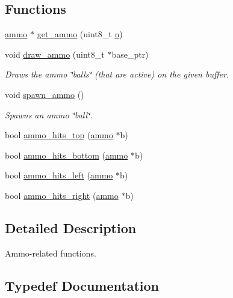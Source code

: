 \subsection*{Functions}
\begin{DoxyCompactItemize}
\item 
\hyperlink{structammo}{ammo} $\ast$ \hyperlink{group__ammo_gafd32649160360f67e00c8dc8186edeef}{get\+\_\+ammo} (uint8\+\_\+t \hyperlink{projectiles_8c_a5a648f5ec00c526b0dfa2df7a272c6c0}{n})
\item 
void \hyperlink{group__ammo_ga4d649b8b03319d3a2cdc2f171f9112ea}{draw\+\_\+ammo} (uint8\+\_\+t $\ast$base\+\_\+ptr)
\begin{DoxyCompactList}\small\item\em Draws the ammo \char`\"{}balls\char`\"{} (that are active) on the given buffer. \end{DoxyCompactList}\item 
void \hyperlink{group__ammo_gac8e56296d8320fc25379a842c74fd72e}{spawn\+\_\+ammo} ()
\begin{DoxyCompactList}\small\item\em Spawns an ammo \char`\"{}ball\char`\"{}. \end{DoxyCompactList}\item 
bool \hyperlink{group__ammo_ga05181ac613d5d6d1d1070031b5461191}{ammo\+\_\+hits\+\_\+top} (\hyperlink{structammo}{ammo} $\ast$b)
\item 
bool \hyperlink{group__ammo_gaec2edee56f7204786a3640973e4f8f7f}{ammo\+\_\+hits\+\_\+bottom} (\hyperlink{structammo}{ammo} $\ast$b)
\item 
bool \hyperlink{group__ammo_ga23525b3b56d7c2217da8179045d80db6}{ammo\+\_\+hits\+\_\+left} (\hyperlink{structammo}{ammo} $\ast$b)
\item 
bool \hyperlink{group__ammo_gabab3a68eb48f6e4f339c648f6cec5522}{ammo\+\_\+hits\+\_\+right} (\hyperlink{structammo}{ammo} $\ast$b)
\end{DoxyCompactItemize}


\subsection{Detailed Description}
Ammo-\/related functions. 



\subsection{Typedef Documentation}
\mbox{\label{group__ammo_ga2beee330181a5b70a5c47092391bb174}} 
